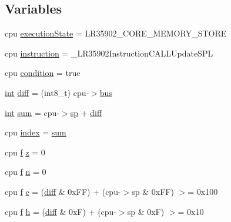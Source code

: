 \subsection*{Variables}
\begin{DoxyCompactItemize}
\item 
cpu \mbox{\hyperlink{isa-lr35902_8c_a087a53d4d283226a73c530dd2883d634}{execution\+State}} = L\+R35902\+\_\+\+C\+O\+R\+E\+\_\+\+M\+E\+M\+O\+R\+Y\+\_\+\+S\+T\+O\+RE
\item 
cpu \mbox{\hyperlink{isa-lr35902_8c_a516462a0e821c76277faaeb2a1364b35}{instruction}} = \+\_\+\+L\+R35902\+Instruction\+C\+A\+L\+L\+Update\+S\+PL
\item 
cpu \mbox{\hyperlink{isa-lr35902_8c_a9cc5e499f71726f3a653debd7bf9ccc7}{condition}} = true
\item 
\mbox{\hyperlink{ioapi_8h_a787fa3cf048117ba7123753c1e74fcd6}{int}} \mbox{\hyperlink{isa-lr35902_8c_a65f3a8178e1f997a7a19a988bb0f4e1a}{diff}} = (int8\+\_\+t) cpu-\/$>$\mbox{\hyperlink{isa-lr35902_8c_a6163e7e073b87ad067db0a3b10da6be9}{bus}}
\item 
\mbox{\hyperlink{ioapi_8h_a787fa3cf048117ba7123753c1e74fcd6}{int}} \mbox{\hyperlink{isa-lr35902_8c_a930b83edda39ee8cfa78dd4574a50bc3}{sum}} = cpu-\/$>$\mbox{\hyperlink{isa-lr35902_8c_a2a917b9f439b612ee0161cab4c4d0568}{sp}} + \mbox{\hyperlink{isa-lr35902_8c_a65f3a8178e1f997a7a19a988bb0f4e1a}{diff}}
\item 
cpu \mbox{\hyperlink{isa-lr35902_8c_ac9ee548085af12859cb52a6c757cf73a}{index}} = \mbox{\hyperlink{isa-lr35902_8c_a930b83edda39ee8cfa78dd4574a50bc3}{sum}}
\item 
cpu \mbox{\hyperlink{isa-arm_8c_a362077c979b0bb65159c603270e40f70}{f}} \mbox{\hyperlink{isa-lr35902_8c_a9bfcf38888761332515ae81f9c499233}{z}} = 0
\item 
cpu \mbox{\hyperlink{isa-arm_8c_a362077c979b0bb65159c603270e40f70}{f}} \mbox{\hyperlink{isa-lr35902_8c_ae54e54065504090672c92ef62a1c5f05}{n}} = 0
\item 
cpu \mbox{\hyperlink{isa-arm_8c_a362077c979b0bb65159c603270e40f70}{f}} \mbox{\hyperlink{isa-lr35902_8c_ab27f9f98dd173bfc694f5d161e839d6e}{c}} = (\mbox{\hyperlink{isa-lr35902_8c_a65f3a8178e1f997a7a19a988bb0f4e1a}{diff}} \& 0x\+F\+F) + (cpu-\/$>$sp \& 0x\+F\+F) $>$= 0x100
\item 
cpu \mbox{\hyperlink{isa-arm_8c_a362077c979b0bb65159c603270e40f70}{f}} \mbox{\hyperlink{isa-lr35902_8c_a06a62682361411df32cf88f75a0b8da4}{h}} = (\mbox{\hyperlink{isa-lr35902_8c_a65f3a8178e1f997a7a19a988bb0f4e1a}{diff}} \& 0x\+F) + (cpu-\/$>$sp \& 0x\+F) $>$= 0x10

\end{DoxyCompactItemize}

